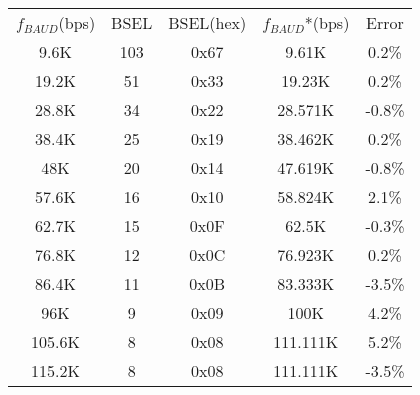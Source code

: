 \begin{tabular}{|c|c|c|c|c|}
  \hline
  \rowcolor[HTML]{FFEAD0} \multicolumn{5}{|c|}{$ f_{PER} $ = 16.0000 MHz} \\
  \hline
  \rowcolor[HTML]{E3FFE3} $ f_{BAUD} $(bps) & BSEL & BSEL(hex) & $ f_{BAUD} $*(bps) & Error \\
  \hline
  9.6K & 103 & 0x67 & 9.61K & 0.2\% \\
  \hline
  19.2K & 51 & 0x33 & 19.23K & 0.2\% \\
  \hline
  28.8K & 34 & 0x22 & 28.571K & -0.8\% \\
  \hline
  38.4K & 25 & 0x19 & 38.462K & 0.2\% \\
  \hline
  48K & 20 & 0x14 & 47.619K & -0.8\% \\
  \hline
  57.6K & 16 & 0x10 & 58.824K & 2.1\% \\
  \hline
  62.7K & 15 & 0x0F & 62.5K & -0.3\% \\
  \hline
  76.8K & 12 & 0x0C & 76.923K & 0.2\% \\
  \hline
  86.4K & 11 & 0x0B & 83.333K & -3.5\% \\
  \hline
  96K & 9 & 0x09 & 100K & 4.2\% \\
  \hline
  105.6K & 8 & 0x08 & 111.111K & 5.2\% \\
  \hline
  115.2K & 8 & 0x08 & 111.111K & -3.5\% \\
  \hline
\end{tabular}